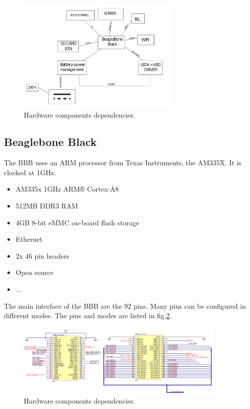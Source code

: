 \begin{figure}[!htb]
    \centering
    \includegraphics[width=0.7\textwidth,keepaspectratio]{chap/hardFig/overall_hardware_dependecies}
    \caption{Hardware components dependencies.}
    \label{fig:hardware dependencies}
\end{figure}

\subsection{Beaglebone Black}
The BBB uses an ARM processor from Texas Instruments, the AM335X. It is clocked at 1GHz.
\begin{itemize}
  \item{ AM335x 1GHz ARM® Cortex-A8 }
  \item{512MB DDR3 RAM}
  \item{4GB 8-bit eMMC on-board flash storage}
  \item{Ethernet}
  \item{2x 46 pin headers}
  \item{Open source}
  \item{...}
\end{itemize}
The main interface of the BBB are the 92 pins. Many pins can be configured in different modes. The pins and modes are listed in fig.\ref{fig:pin modes}.
\clearpage


\begin{figure}
    \centering
    \includegraphics[width=0.9\textwidth,keepaspectratio]{chap/hardFig/BBB_pins_sch}
    \caption{Hardware components dependencies.}
    \label{fig:pin modes}
\end{figure}

